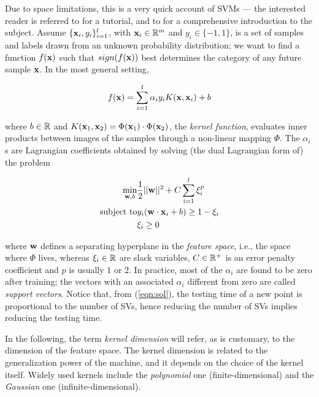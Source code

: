 Due to space limitations, this is a very quick account of SVMs --- the
interested reader is referred to \cite{Burges98} for a tutorial, and
to \cite{Cristianini00} for a comprehensive introduction to the
subject. Assume $\{\mathbf{x}_i,y_i\}_{i=1}^l$, with $\mathbf{x}_i \in \mathbb{R}^m$ and
$y_i \in \{-1,1\}$, is a set of samples and labels drawn from an
unknown probability distribution; we want to find a function $f(\mathbf{x})$
such that $sign(f(\mathbf{x}))$ best determines the category of any future
sample $\mathbf{x}$. In the most general setting,

\begin{equation} \label{eqn:sol}
  f(\mathbf{x}) = \sum_{i=1}^l \alpha_i y_i K(\mathbf{x},\mathbf{x}_i) + b
\end{equation}

\noindent where $b \in \mathbb{R}$ and $K(\mathbf{x}_1,\mathbf{x}_2) = \Phi(\mathbf{x}_1)
\cdot \Phi(\mathbf{x}_2)$, the \emph{kernel function}, evaluates inner
products between images of the samples through a non-linear mapping
$\Phi$. The $\alpha_i$s are Lagrangian coefficients obtained by
solving (the dual Lagrangian form of) the problem

\begin{eqnarray} \label{eqn:svm_primal}
  \min_{\mathbf{w},b}      & \frac{1}{2} ||\mathbf{w}||^2 + C \sum_{i=1}^l \xi_i^p            \\
  \mbox{subject to} & y_i (\mathbf{w}\cdot\mathbf{x}_i + b) \geq 1-\xi_i            \nonumber \\
                    & \xi_i \geq 0                                    \nonumber
\end{eqnarray}

\noindent where $\mathbf{w}$ defines a separating hyperplane
in the \emph{feature space}, i.e., the space where $\Phi$ lives,
whereas $\xi_i \in \mathbb{R}$ are slack variables, $C \in \mathbb{R}^+$ is an error
penalty coefficient and $p$ is usually $1$ or $2$. In practice, most
of the $\alpha_i$ are found to be zero after training; the vectors
with an associated $\alpha_i$ different from zero are called
\emph{support vectors}. Notice that, from (\ref{eqn:sol}), the testing
time of a new point is proportional to the number of SVs, hence
reducing the number of SVs implies reducing the testing time.

In the following, the term \emph{kernel dimension} will refer, as is
customary, to the dimension of the feature space. The kernel dimension
is related to the generalization power of the machine, and it depends
on the choice of the kernel itself. Widely used kernels include the
\emph{polynomial} one (finite-dimensional) and the \emph{Gaussian} one
(infinite-dimensional).
